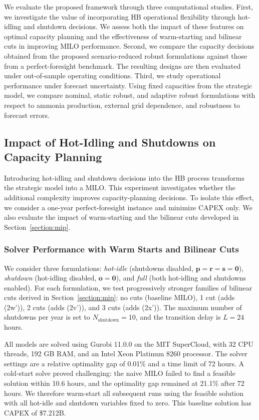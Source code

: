 \documentclass[11pt, letter]{article}
\begin{document}
We evaluate the proposed framework through three computational studies. First, we investigate the value of incorporating HB operational flexibility through hot-idling and shutdown decisions. We assess both the impact of these features on optimal capacity planning and the effectiveness of warm-starting and bilinear cuts in improving MILO performance. Second, we compare the capacity decisions obtained from the proposed scenario-reduced robust formulations against those from a perfect-foresight benchmark. The resulting designs are then evaluated under out-of-sample operating conditions. Third, we study operational performance under forecast uncertainty. Using fixed capacities from the strategic model, we compare nominal, static robust, and adaptive robust formulations with respect to ammonia production, external grid dependence, and robustness to forecast errors.

\subsection{Impact of Hot-Idling and Shutdowns on Capacity Planning}\label{exp:mip}

Introducing hot-idling and shutdown decisions into the HB process transforms the strategic model into a MILO. This experiment investigates whether the additional complexity improves capacity-planning decisions. To isolate this effect, we consider a one-year perfect-foresight instance and minimize CAPEX only. We also evaluate the impact of warm-starting and the bilinear cuts developed in Section~\ref{section:mip}.
\subsubsection{Solver Performance with Warm Starts and Bilinear Cuts}

We consider three formulations: \textit{hot-idle} (shutdowns disabled, $\boldsymbol p=\boldsymbol r=\boldsymbol s=\boldsymbol 0$), \textit{shutdown} (hot-idling disabled, $\boldsymbol o=\boldsymbol 0$), and \textit{full} (both hot-idling and shutdowns enabled). For each formulation, we test progressively stronger families of bilinear cuts derived in Section~\ref{section:mip}: no cuts (baseline MILO), 1 cut (adds (2w')), 2 cuts (adds (2v')), and 3 cuts (adds (2x')). The maximum number of shutdowns per year is set to $N_{\mathrm{shutdown}}=10$, and the transition delay is $L = 24$ hours.

All models are solved using Gurobi 11.0.0 on the MIT SuperCloud, with 32 CPU threads, 192 GB RAM, and an Intel Xeon Platinum 8260 processor. The solver settings are a relative optimality gap of 0.01\% and a time limit of 72 hours.
A cold-start solve proved challenging: the naive MILO failed to find a feasible solution within 10.6 hours, and the optimality gap remained at 21.1\% after 72 hours. We therefore warm-start all subsequent runs using the feasible solution with all hot-idle and shutdown variables fixed to zero. This baseline solution has CAPEX of \$7.212B.
\end{document}
